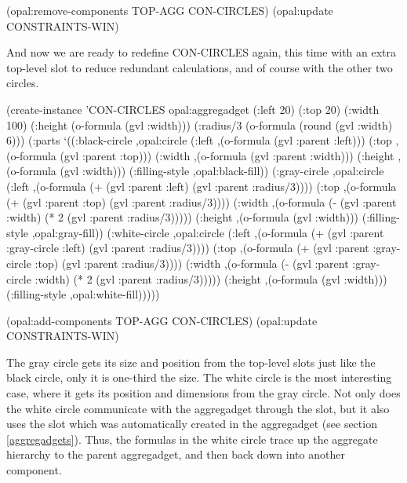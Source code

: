 \begin{programexample}
(opal:remove-components TOP-AGG CON-CIRCLES)
(opal:update CONSTRAINTS-WIN)
\end{programexample}

And now we are ready to redefine CON-CIRCLES again, this time with an
extra top-level slot to reduce redundant calculations, and of course
with the other two circles.

\begin{programexample}
(create-instance 'CON-CIRCLES opal:aggregadget
   (:left 20) (:top 20)
   (:width 100)
   (:height (o-formula (gvl :width)))
   (:radius/3 (o-formula (round (gvl :width) 6)))
   (:parts
    `((:black-circle ,opal:circle
                     (:left ,(o-formula (gvl :parent :left)))
                     (:top ,(o-formula (gvl :parent :top)))
                     (:width ,(o-formula (gvl :parent :width)))
                     (:height ,(o-formula (gvl :width)))
                     (:filling-style ,opal:black-fill))
      (:gray-circle ,opal:circle
                    (:left ,(o-formula (+ (gvl :parent :left)
					  (gvl :parent :radius/3))))
                    (:top ,(o-formula (+ (gvl :parent :top)
					 (gvl :parent :radius/3))))
                    (:width ,(o-formula (- (gvl :parent :width)
					   (* 2 (gvl :parent :radius/3)))))
                    (:height ,(o-formula (gvl :width)))
                    (:filling-style ,opal:gray-fill))
      (:white-circle ,opal:circle
                     (:left ,(o-formula (+ (gvl :parent :gray-circle :left)
					   (gvl :parent :radius/3))))
                     (:top ,(o-formula (+ (gvl :parent :gray-circle :top)
					  (gvl :parent :radius/3))))
                     (:width ,(o-formula (- (gvl :parent :gray-circle :width)
					    (* 2 (gvl :parent :radius/3)))))
                     (:height ,(o-formula (gvl :width)))
                     (:filling-style ,opal:white-fill)))))

(opal:add-components TOP-AGG CON-CIRCLES)
(opal:update CONSTRAINTS-WIN)
\end{programexample}

The gray circle gets its size and position from the top-level slots
just like the black circle, only it is one-third the size.  The white circle
is the most interesting case, where it gets its position and
dimensions from the gray circle.  Not only does the white circle
communicate with the aggregadget through the  slot, but it
also uses the slot  which was automatically created
in the aggregadget (see section \ref{aggregadgets}).  Thus, the
formulas in the white circle trace up the aggregate hierarchy to the
parent aggregadget, and then back down into another component.


